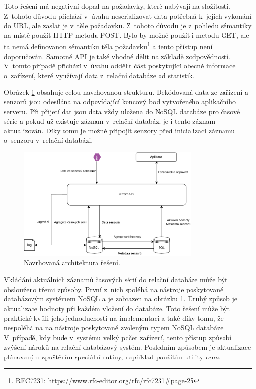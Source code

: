 Toto řešení má negativní dopad na požadavky, které nabývají na složitosti. Z~tohoto důvodu přichází v~úvahu neserializovat data potřebná k~jejich vykonání do URL, ale zaslat je v~těle požadavku. Z~tohoto důvodu je z~pohledu sémantiky na místě použít HTTP metodu POST. Bylo by možné použít i metodu GET, ale ta nemá definovanou sémantiku těla požadavku\footnote{RFC7231: \url{https://www.rfc-editor.org/rfc/rfc7231\#page-25}} a tento přístup není doporučován. Samotné API je také vhodné dělit na základě zodpovědností. V~tomto případě přichází v~úvahu oddělit část poskytující obecné informace o~zařízení, které využívají data z~relační databáze od statistik.

Obrázek \ref{layerArchitecture} obsahuje celou navrhovanou strukturu. Dekódovaná data ze zařízení a senzorů jsou odesílána na odpovídající koncový bod vytvořeného aplikačního serveru. Při přijetí dat jsou data vždy uložena do NoSQL databáze pro časové série a pokud už existuje záznam v~relační databázi je i tento záznam aktualizován. Díky tomu je možné připojit senzory před inicializací záznamu o~senzoru v~relační databázi. 

\begin{figure}[H]
\label{layerArchitecture}
\begin{center}
    \includegraphics[width=0.8\textwidth]{obrazky-figures/layerArchitecture.pdf}
\end{center}
\caption{Navrhovaná architektura řešení.}
\end{figure}

Vkládání aktuálních záznamů časových sérií do relační databáze může být obslouženo třemi způsoby. První z~nich spoléhá na nástroje poskytované databázovým systémem NoSQL a je zobrazen na obrázku \ref{layerArchitecture}. Druhý způsob je aktualizace hodnoty při každém vložení do databáze. Toto řešení může být praktické kvůli jeho jednoduchosti na implementaci a také díky tomu, že nespoléhá na na nástroje poskytované zvoleným typem NoSQL databáze. V~případě, kdy bude v~systému velký počet zařízení, tento přístup způsobí zvýšení nároků na relační databázový systém. Posledním způsobem je aktualizace plánovaným spuštěním speciální rutiny, například použitím utility \textit{cron}.


